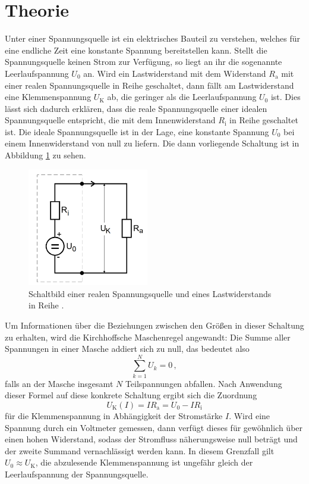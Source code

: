 \section{Theorie}
\label{sec:Theorie}
Unter einer Spannungsquelle ist ein elektrisches Bauteil zu verstehen,
welches für eine endliche Zeit eine konstante Spannung bereitstellen kann. Stellt die
Spannungsquelle keinen Strom zur Verfügung, so liegt an ihr die sogenannte Leerlaufspannung
$U_0$ an. Wird ein Lastwiderstand mit dem Widerstand $R_\text{a}$ mit
einer realen Spannungsquelle in Reihe geschaltet, dann fällt am Lastwiderstand
eine Klemmenspannung $U_\text{K}$ ab, die geringer als die Leerlaufspannung $U_0$
ist. Dies lässt sich dadurch erklären, dass die reale Spannungsquelle einer
idealen Spannungsquelle entspricht, die mit dem Innenwiderstand
$R_\text{i}$ in Reihe geschaltet ist. Die ideale Spannungsquelle ist in der Lage,
eine konstante Spannung $U_0$ bei einem Innenwiderstand von null zu liefern.
Die dann vorliegende Schaltung ist in Abbildung \ref{fig:ersatzschaltbild} zu sehen.

\begin{figure}
  \centering
  \includegraphics[width=150pt]{data/ersatzschaltbild.png}
  \caption{Schaltbild einer realen Spannungsquelle und eines Lastwiderstands in Reihe \cite{Versuchsanleitung}.}
  \label{fig:ersatzschaltbild}
\end{figure}

Um Informationen über die Beziehungen zwischen den Größen in dieser Schaltung zu erhalten,
wird die Kirchhoffsche Maschenregel angewandt: Die Summe aller Spannungen in einer
Masche addiert sich zu null, das bedeutet also
\begin{equation}
  \sum\limits_{k=1}^N U_k = 0\,,
  \label{eqn:kirchhoffmasche}
\end{equation}
falls an der Masche insgesamt $N$ Teilspannungen abfallen.
Nach Anwendung dieser Formel auf diese konkrete Schaltung ergibt sich die Zuordnung
\begin{equation}
  U_\text{K}(I) = I R_\text{a} = U_0 - I R_\text{i}
  \label{eqn:klemmevoni}
\end{equation}
für die Klemmenspannung in Abhängigkeit der Stromstärke $I$. Wird eine Spannung durch
ein Voltmeter gemessen, dann verfügt dieses für gewöhnlich über einen hohen Widerstand,
sodass der Stromfluss näherungsweise null beträgt und der zweite Summand vernachlässigt
werden kann.
In diesem Grenzfall gilt $U_0 \approx U_\text{K}$, die abzulesende
Klemmenspannung ist ungefähr gleich der Leerlaufspannung der Spannungsquelle.

